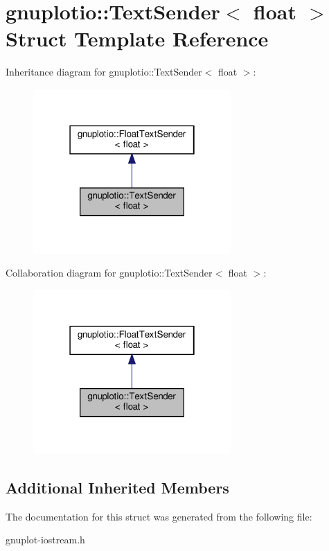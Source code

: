 \hypertarget{structgnuplotio_1_1TextSender_3_01float_01_4}{}\section{gnuplotio\+:\+:Text\+Sender$<$ float $>$ Struct Template Reference}
\label{structgnuplotio_1_1TextSender_3_01float_01_4}


Inheritance diagram for gnuplotio\+:\+:Text\+Sender$<$ float $>$\+:
\nopagebreak
\begin{figure}[H]
\begin{center}
\leavevmode
\includegraphics[width=214pt]{structgnuplotio_1_1TextSender_3_01float_01_4__inherit__graph}
\end{center}
\end{figure}


Collaboration diagram for gnuplotio\+:\+:Text\+Sender$<$ float $>$\+:
\nopagebreak
\begin{figure}[H]
\begin{center}
\leavevmode
\includegraphics[width=214pt]{structgnuplotio_1_1TextSender_3_01float_01_4__coll__graph}
\end{center}
\end{figure}
\subsection*{Additional Inherited Members}


The documentation for this struct was generated from the following file\+:\begin{DoxyCompactItemize}
\item 
gnuplot-\/iostream.\+h\end{DoxyCompactItemize}
